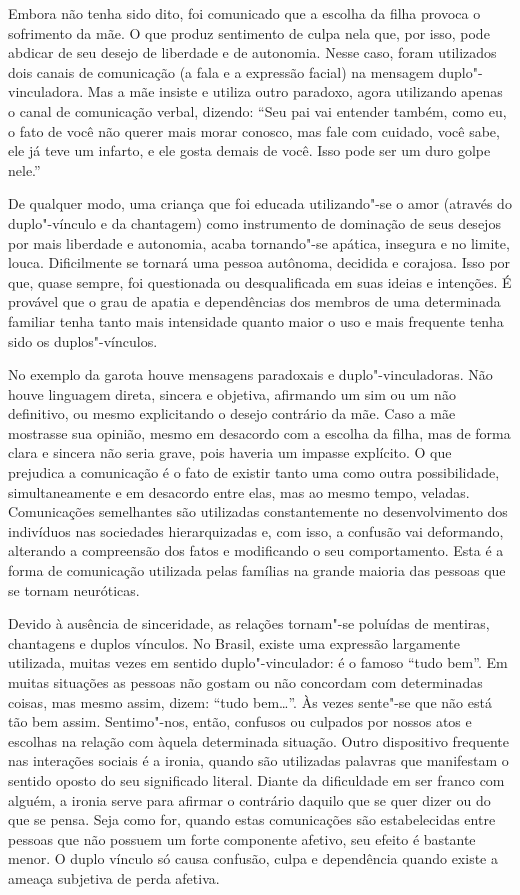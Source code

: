 Embora não tenha sido dito, foi comunicado que a escolha da filha
provoca o sofrimento da mãe. O que produz sentimento de culpa nela que,
por isso, pode abdicar de seu desejo de liberdade e de autonomia. Nesse
caso, foram utilizados dois canais de comunicação (a fala e a expressão
facial) na mensagem duplo"-vinculadora. Mas a mãe insiste e utiliza outro
paradoxo, agora utilizando apenas o canal de comunicação verbal,
dizendo: ``Seu pai vai entender também, como eu, o fato de você não
querer mais morar conosco, mas fale com cuidado, você sabe, ele já teve
um infarto, e ele gosta demais de você. Isso pode ser um duro golpe
nele.''

De qualquer modo, uma criança que foi educada utilizando"-se o amor
(através do duplo"-vínculo e da chantagem) como instrumento de dominação
de seus desejos por mais liberdade e autonomia, acaba tornando"-se
apática, insegura e no limite, louca. Dificilmente se tornará uma pessoa
autônoma, decidida e corajosa. Isso por que, quase sempre, foi
questionada ou desqualificada em suas ideias e intenções. É provável que
o grau de apatia e dependências dos membros de uma determinada familiar
tenha tanto mais intensidade quanto maior o uso e mais frequente tenha
sido os duplos"-vínculos.

No exemplo da garota houve mensagens paradoxais e duplo"-vinculadoras.
Não houve linguagem direta, sincera e objetiva, afirmando um sim ou um
não definitivo, ou mesmo explicitando o desejo contrário da mãe. Caso a
mãe mostrasse sua opinião, mesmo em desacordo com a escolha da filha,
mas de forma clara e sincera não seria grave, pois haveria um impasse
explícito. O que prejudica a comunicação é o fato de existir tanto uma
como outra possibilidade, simultaneamente e em desacordo entre elas, mas
ao mesmo tempo, veladas. Comunicações semelhantes são utilizadas
constantemente no desenvolvimento dos indivíduos nas sociedades
hierarquizadas e, com isso, a confusão vai deformando, alterando a
compreensão dos fatos e modificando o seu comportamento. Esta é a forma
de comunicação utilizada pelas famílias na grande maioria das pessoas
que se tornam neuróticas.

Devido à ausência de sinceridade, as relações tornam"-se poluídas de
mentiras, chantagens e duplos vínculos. No Brasil, existe uma expressão
largamente utilizada, muitas vezes em sentido duplo"-vinculador: é o
famoso ``tudo bem''. Em muitas situações as pessoas não gostam ou não
concordam com determinadas coisas, mas mesmo assim, dizem: ``tudo
bem\ldots{}''. Às vezes sente"-se que não está tão bem assim. Sentimo"-nos,
então, confusos ou culpados por nossos atos e escolhas na relação com
àquela determinada situação. Outro dispositivo frequente nas interações
sociais é a ironia, quando são utilizadas palavras que manifestam o
sentido oposto do seu significado literal. Diante da dificuldade em ser
franco com alguém, a ironia serve para afirmar o contrário daquilo que
se quer dizer ou do que se pensa. Seja como for, quando estas
comunicações são estabelecidas entre pessoas que não possuem um forte
componente afetivo, seu efeito é bastante menor. O duplo vínculo só
causa confusão, culpa e dependência quando existe a ameaça subjetiva de
perda afetiva.


